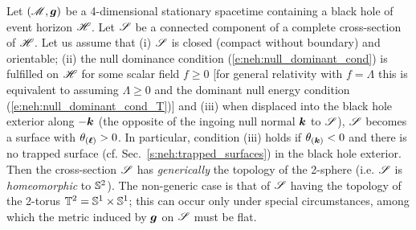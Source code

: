 \begin{prop}
\label{p:sta:topology1}
Let $(\mathscr{M}, \bm{g})$ be a 4-dimensional stationary spacetime
containing a black hole of event horizon $\mathscr{H}$.
Let $\mathscr{S}$ be a connected component of a complete cross-section of $\mathscr{H}$.
Let us assume that (i) $\mathscr{S}$ is closed (compact without boundary) and orientable;
(ii) the null dominance condition (\ref{e:neh:null_dominant_cond})
is fulfilled on $\mathscr{H}$ for some scalar field $f \geq 0$
[for general relativity with $f=\Lambda$
this is equivalent to assuming $\Lambda \geq 0$ and
the dominant null energy condition (\ref{e:neh:null_dominant_cond_T})]
and (iii) when
displaced into the black hole exterior along $-\bm{k}$ (the opposite of
the ingoing null normal $\bm{k}$ to $\mathscr{S}$),
$\mathscr{S}$ becomes a surface with $\theta_{(\bm{\ell})} > 0$.
In particular, condition (iii) holds if $\theta_{(\bm{k})} < 0$ and there is no trapped
surface (cf. Sec.~\ref{s:neh:trapped_surfaces}) in the black hole exterior.
Then the cross-section $\mathscr{S}$
has \emph{generically} the topology of the 2-sphere (i.e. $\mathscr{S}$ is
\emph{homeomorphic} to $\mathbb{S}^2$). The non-generic case
is that of $\mathscr{S}$ having the topology of the 2-torus $\mathbb{T}^2 = \mathbb{S}^1\times\mathbb{S}^1$; this can occur only under special circumstances,
among which the metric induced by $\bm{g}$ on $\mathscr{S}$ must be flat.
\end{prop}

